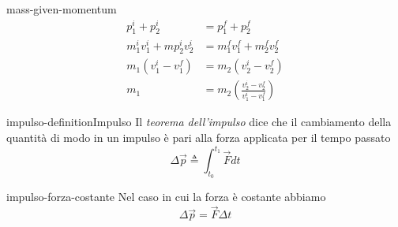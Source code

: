 \documentclass[preview]{standalone}
\begin{document}

\begin{snippet}{mass-given-momentum}
    \begin{align*}
        p_1^i + p_2^i &= p_1^f + p_2^f \\
        m_1^i v_1^i + mp_2^i  v_2^i &= m_1^f v_1^f + m_2^f v_2^f \\
        m_1 (v_1^i - v_1^f) &= m_2 (v_2^i - v_2^f) \\
        m_1 &= m_2 \left(
            \frac{v_2^i - v_2^f}{v_1^i - v_1^f}
        \right)
    \end{align*}
\end{snippet}

\begin{snippetdefinition}{impulso-definition}{Impulso}
    Il \textit{teorema dell'impulso}
    dice che il cambiamento della quantità di modo in un impulso
    è pari alla forza applicata per il tempo passato
    \[
        \Delta \vec{p} \triangleq \int_{t_0}^{t_1} \vec{F} dt    
    \]
\end{snippetdefinition}

\begin{snippet}{impulso-forza-costante}
    Nel caso in cui la forza è costante abbiamo
    \[
        \Delta \vec{p} = \vec{F}\Delta t
    \]
\end{snippet}
\end{document}
